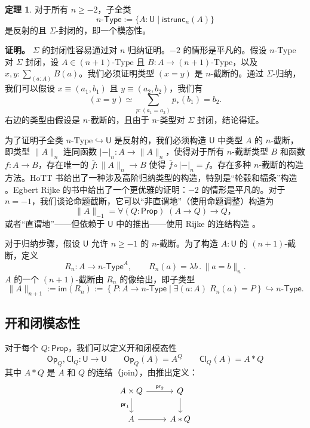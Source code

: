 \documentclass[UTF8]{ctexart}
\theoremstyle{definition}
\newtheorem{theorem}{定理}[section]
\newcommand{\U}{\mathsf{U}}
\newcommand{\Prop}{\mathsf{Prop}}
\begin{document}
\begin{theorem}
对于所有 $n \geq -2$，子全类
\[
n\mathsf{\text{-}Type} := \{A:\U \mid \mathsf{istrunc}_n(A)\}
\]
是反射的且 $\Sigma$-封闭的，即一个模态性。
\end{theorem}

\noindent\textbf{证明。} $\Sigma$ 的封闭性容易通过对 $n$ 归纳证明。$-2$ 的情形是平凡的。假设 $n$-Type 对 $\Sigma$ 封闭，设 $A \in (n+1)\text{-Type}$ 且 $B : A \to (n+1)\text{-Type}$，以及 $x, y : \sum_{(a:A)} B(a)$。我们必须证明类型 $(x=y)$ 是 $n$-截断的。通过 $\Sigma$-归纳，我们可以假设 $x \equiv (a_1, b_1)$ 且 $y \equiv (a_2, b_2)$，我们有
\[
(x=y) \simeq \sum_{p:(a_1=a_2)} p_*(b_1) = b_2.
\]
右边的类型由假设是 $n$-截断的，且由于 $n$-类型对 $\Sigma$ 封闭，结论得证。

为了证明子全类 $n\text{-Type} \hookrightarrow \U$ 是反射的，我们必须构造 $\U$ 中类型 $A$ 的 $n$-截断，即类型 $\|A\|_n$ 连同函数 $|-|_n : A \to \|A\|_n$，使得对于所有 $n$-截断类型 $B$ 和函数 $f : A \to B$，存在唯一的 $\bar{f} : \|A\|_n \to B$ 使得 $\bar{f} \circ |-|_n = f$。存在多种 $n$-截断的构造方法。HoTT 书给出了一种涉及高阶归纳类型的构造，特别是``轮毂和辐条''构造 \cite[第 7.3 节]{Uni13}。Egbert Rijke 的书中给出了一个更优雅的证明：$-2$ 的情形是平凡的。对于 $n=-1$，我们谈论命题截断，它可以``非直谓地''（使用命题调整）构造为
\[
\|A\|_{-1} = \forall(Q:\Prop)\; (A \to Q) \to Q，
\]
或者``直谓地''——但依赖于 $\U$ 中的推出——使用 Rijke 的连结构造 \cite{Rij17}。

对于归纳步骤，假设 $\U$ 允许 $n \geq -1$ 的 $n$-截断。为了构造 $A:\U$ 的 $(n+1)$-截断，定义
\[
R_n : A \to n\mathsf{\text{-}Type}^A, \qquad R_n(a) = \lambda b\,.\, \|a=b\|_n.
\]
$A$ 的一个 $(n+1)$-截断由 $R_n$ 的像给出，即子类型
\[
\|A\|_{n+1} := \mathsf{im}(R_n) := \left\{P : A \to n\mathsf{\text{-}Type} \mid \exists(a:A)\; R_n(a) = P\right\} \hookrightarrow n\mathsf{\text{-}Type}. \tag*{$\blacksquare$}
\]

\subsection{开和闭模态性}

对于每个 $Q:\Prop$，我们可以定义开和闭模态性
\[
\mathsf{Op}_Q, \mathsf{Cl}_Q : \U \to \U \qquad \mathsf{Op}_Q(A) = A^Q \qquad \mathsf{Cl}_Q(A) = A * Q
\]
其中 $A * Q$ 是 $A$ 和 $Q$ 的连结（join），由推出定义：
\[
\begin{tikzcd}
A \times Q \arrow[r, "\mathsf{pr}_2"] \arrow[d, "\mathsf{pr}_1"'] & Q \arrow[d] \\
A \arrow[r] & A * Q
\end{tikzcd}
\]
\end{document}
